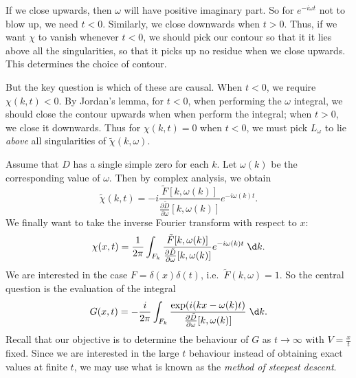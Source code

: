 \documentclass[a4paper]{article}
\begin{document}
If we close upwards, then $\omega$ will have positive imaginary part. So for $e^{-i\omega t}$ not to blow up, we need $t < 0$. Similarly, we close downwards when $t > 0$. Thus, if we want $\chi$ to vanish whenever $t < 0$, we should pick our contour so that it it lies above all the singularities, so that it picks up no residue when we close upwards. This determines the choice of contour.

But the key question is which of these are causal. When $t < 0$, we require $\chi(k, t) < 0$. By Jordan's lemma, for $t < 0$, when performing the $\omega$ integral, we should close the contour upwards when when perform the integral; when $t > 0$, we close it downwards. Thus for $\chi(k, t) = 0$ when $t < 0$, we must pick $L_\omega$ to lie \emph{above} all singularities of $\tilde{\chi}(k, \omega)$.

%
%

Assume that $D$ has a single simple zero for each $k$. Let $\omega(k)$ be the corresponding value of $\omega$. Then by complex analysis, we obtain
\[
  \tilde{\chi}(k, t) = -i\frac{\tilde{F}[k, \omega(k)]}{\frac{\partial \tilde{D}}{\partial \omega}[k, \omega(k)]} e^{-i\omega(k) t}.
\]
We finally want to take the inverse Fourier transform with respect to $x$:
\[
  \chi(x, t) = \frac{1}{2\pi}\int_{F_k} \frac{\tilde{F}[k, \omega(k)]}{\frac{\partial \tilde{D}}{\partial \omega}[k, \omega(k)]} e^{-i\omega(k) t}\;\d k.
\]
We are interested in the case $F = \delta(x) \delta(t)$, i.e.\ $\tilde{F}(k, \omega) = 1$. So the central question is the evaluation of the integral
\[
  G(x, t) = -\frac{i}{2\pi}\int_{F_k} \frac{\exp(i(kx - \omega(k) t)}{\frac{\partial\tilde{D}}{\partial \omega}[k, \omega(k)]}\;\d k.
\]
Recall that our objective is to determine the behaviour of $G$ as $t \to \infty$ with $V = \frac{x}{t}$ fixed. Since we are interested in the large $t$ behaviour instead of obtaining exact values at finite $t$, we may use what is known as the \emph{method of steepest descent}.
\end{document}
